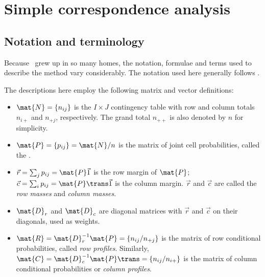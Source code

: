 \documentclass[11pt]{book}\usepackage[]{graphicx}\usepackage[]{color}
\begin{document}
\section{Simple correspondence analysis}\label{sec:ca-simple}

\subsection{Notation and terminology}\label{sec:ca-notation}
Because \CA\ grew up in so many homes, the notation, formulae
and terms used to describe the method vary considerably.
The notation used here generally follows \citet{Greenacre:84,Greenacre:97,Greenacre:2007}.

The descriptions here employ the following matrix and vector definitions:
\begin{itemize}
\item $\mat{N} = \{ n_{ij} \}$ is the $I \times J$ contingency table
with row and column totals $n_{i+}$ and $n_{+j}$, respectively.
The grand total $n_{++}$ is also denoted by $n$ for simplicity.
\item $\mat{P} = \{ p_{ij} \} = \mat{N}/n$ is the matrix of joint cell
probabilities,  called the .
\item $\vec{r} = \sum_j p_{ij} = \mat{P} \vec{1}$ is the row margin of $\mat{P}$;
$\vec{c} = \sum_i p_{ij} = \mat{P}\trans \vec{1}$ is the column margin.
$\vec{r}$ and $\vec{c}$ are called the \emph{row masses} and \emph{column masses}.
\item $\mat{D}_r$ and $\mat{D}_c$ are diagonal matrices with $\vec{r}$
and $\vec{c}$ on their diagonals, used as weights.
\item $\mat{R} = \mat{D}_r^{-1} \mat{P} = \{ n_{ij} / n_{+j} \}$ is the matrix of
row conditional probabilities, called \emph{row profiles}.
Similarly, $\mat{C} = \mat{D}_c^{-1} \mat{P}\trans = \{ n_{ij} / n_{i+} \}$ is the matrix of
column conditional probabilities or \emph{column profiles}.
\end{itemize}
\end{document}
